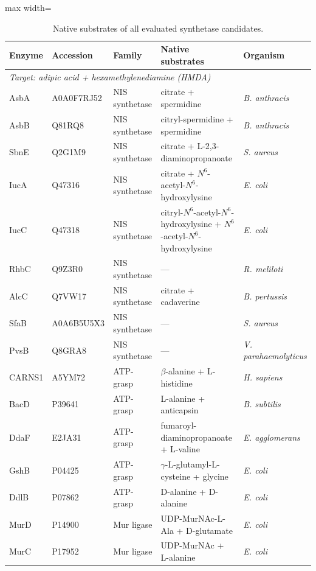 \documentclass[12pt]{article}
\begin{document}
\begin{table}[H]
\centering
\caption{Native substrates of all evaluated synthetase candidates.}
\label{tab:native_substrates}
\begin{adjustbox}{max width=\textwidth}
\small
\begin{tabular}{lllll}
\toprule
\textbf{Enzyme} & \textbf{Accession} & \textbf{Family} & \textbf{Native substrates} & \textbf{Organism} \\
\midrule
\multicolumn{5}{l}{\textit{Target: adipic acid + hexamethylenediamine (HMDA)}} \\
\midrule
AsbA & A0A0F7RJ52 & NIS synthetase & citrate + spermidine & \textit{B. anthracis} \\
AsbB & Q81RQ8 & NIS synthetase & citryl-spermidine + spermidine & \textit{B. anthracis} \\
SbnE & Q2G1M9 & NIS synthetase & citrate + L-2,3-diaminopropanoate & \textit{S. aureus} \\
IucA & Q47316 & NIS synthetase & citrate + $N^6$-acetyl-$N^6$-hydroxylysine & \textit{E. coli} \\
IucC & Q47318 & NIS synthetase & citryl-$N^6$-acetyl-$N^6$-hydroxylysine + $N^6$-acetyl-$N^6$-hydroxylysine & \textit{E. coli} \\
RhbC & Q9Z3R0 & NIS synthetase & --- & \textit{R. meliloti} \\
AlcC & Q7VW17 & NIS synthetase & citrate + cadaverine & \textit{B. pertussis} \\
SfaB & A0A6B5U5X3 & NIS synthetase & --- & \textit{S. aureus} \\
PvsB & Q8GRA8 & NIS synthetase & --- & \textit{V. parahaemolyticus} \\
\midrule
CARNS1 & A5YM72 & ATP-grasp & $\beta$-alanine + L-histidine & \textit{H. sapiens} \\
BacD & P39641 & ATP-grasp & L-alanine + anticapsin & \textit{B. subtilis} \\
DdaF & E2JA31 & ATP-grasp & fumaroyl-diaminopropanoate + L-valine & \textit{E. agglomerans} \\
GshB & P04425 & ATP-grasp & $\gamma$-L-glutamyl-L-cysteine + glycine & \textit{E. coli} \\
DdlB & P07862 & ATP-grasp & D-alanine + D-alanine & \textit{E. coli} \\
\midrule
MurD & P14900 & Mur ligase & UDP-MurNAc-L-Ala + D-glutamate & \textit{E. coli} \\
MurC & P17952 & Mur ligase & UDP-MurNAc + L-alanine & \textit{E. coli} \\

\end{tabular}
\end{adjustbox}
\end{table}
\end{document}
